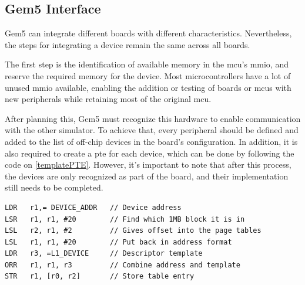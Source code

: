 \subsection{Gem5 Interface}

Gem5 can integrate different boards with different characteristics. Nevertheless, the steps for integrating a device remain the same across 
all boards. 

The first step is the identification of available memory in the \gls{mcu}'s \gls{mmio}, and reserve the required memory for the device. 
Most microcontrollers have a lot of unused \gls{mmio} available, enabling the addition or testing of boards or \glspl{mcu} with new 
peripherals while retaining most of the original \gls{mcu}.

After planning this, Gem5 must recognize this hardware to enable communication with the other simulator. 
To achieve that, every peripheral should be defined and added to the list of off-chip devices in the 
board's configuration. In addition, it is also required to create a \gls{pte} for each device, which can be done by following the
code on \ref{templatePTE}. However, it's important to note that after this process, the devices are only recognized as part of the 
board, and their implementation still needs to be completed.

\hspace{1cm}

\begin{lstlisting}[style=customasm, caption={Template for a \gls{pte}}, label=templatePTE]
LDR   r1,= DEVICE_ADDR	 // Device address
LSR   r1, r1, #20        // Find which 1MB block it is in
LSL   r2, r1, #2         // Gives offset into the page tables
LSL   r1, r1, #20        // Put back in address format
LDR   r3, =L1_DEVICE     // Descriptor template
ORR   r1, r1, r3         // Combine address and template
STR   r1, [r0, r2]       // Store table entry
\end{lstlisting}


